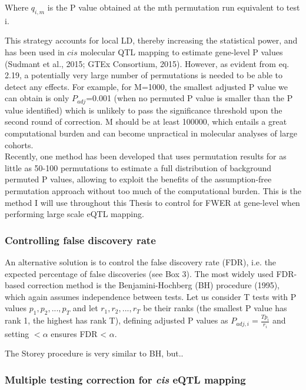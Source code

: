 Where $q_{i,m}$ is the P value obtained at the mth permutation run equivalent to test i.  

This strategy accounts for local LD, thereby increasing the statistical power, and has been used in $cis$ molecular QTL mapping to estimate gene-level P values (Sudmant et al., 2015; GTEx Consortium, 2015).  
However, as evident from eq. 2.19, a potentially very large number of permutations is needed to be able to detect any effects.
For example, for M=1000, the smallest adjusted P value we can obtain is only $P_{adj}$=0.001 (when no permuted P value is smaller than the P value identified) which is unlikely to pass the significance threshold upon the second round of correction.
M should be at least 100000, which entails a great computational burden and can become unpractical in molecular analyses of large cohorts.\\

Recently, one method has been developed that uses permutation results for as little as 50-100 permutations to estimate a full distribution of background permuted P values, allowing to exploit the benefits of the assumption-free permutation approach without too much of the computational burden. 
This is the method I will use throughout this Thesis to control for FWER at gene-level when performing large scale eQTL mapping.

\subsubsection{Controlling false discovery rate}

An alternative solution is to control the false discovery rate (FDR), i.e. the expected percentage of false discoveries (see Box 3).
The most widely used FDR-based correction method is the Benjamini-Hochberg (BH) procedure (1995), which again assumes independence between tests. 
Let us consider T tests with P values $p_1, p_2, ..., p_T$ and let $r_1, r_2, ..., r_T$ be their ranks (the smallest P value has rank 1, the highest has rank T), defining adjusted P values as $P_{adj,i} = \frac{Tp_i}{r_i} $ and setting $<\alpha$ ensures FDR < $\alpha$.

The Storey procedure is very similar to BH, but..

\subsubsection{Multiple testing correction for \textit{cis} eQTL mapping}

